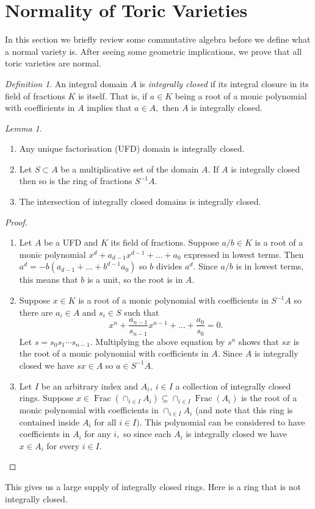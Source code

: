 \documentclass[BSc]{usydthesis}
\numberwithin{equation}{chapter}
\theoremstyle{remark}
\newtheorem{Definition}[equation]{Definition}
\newtheorem{Lemma}[equation]{Lemma}
\begin{document}
\section{Normality of Toric Varieties}


In this section we briefly review some commutative algebra before we define what a normal variety is. After seeing some geometric implications, we prove that all toric varieties are normal. 

\begin{Definition}
 An integral domain $A$ is {\em integrally closed} if its integral closure in its field of fractions $K$ is itself. That is, if $a \in K$ being a root of a monic polynomial with coefficients in $A$ implies that $a \in A,$ then $A$ is integrally closed. 
\end{Definition}

\begin{Lemma}\label{IntClosed}
~
\begin{enumerate}
 \item Any unique factorisation (UFD) domain is integrally closed.
 \item Let $S\subset A$ be a multiplicative set of the domain $A.$ If $A$ is integrally closed then so is the ring of fractions $S^{-1}A.$
 \item The intersection of integrally closed domains is integrally closed.
\end{enumerate}
\end{Lemma}

\begin{proof}
~
\begin{enumerate}
 \item Let $A$ be a UFD and $K$ its field of fractions. Suppose $a/b \in K$ is a root of a monic polynomial $x^d+a_{d-1}x^{d-1} + \ldots + a_0$ expressed in lowest terms. Then $a^d = -b(a_{d-1} + \ldots + b^{d-1}a_0 )$ so $b$ divides $a^d.$ Since $a/b$ is in lowest terms, this means that $b$ is a unit, so the root is in $A.$
 \item Suppose $x\in K$ is a root of a monic polynomial with coefficients in $S^{-1}A$ so there are $a_i\in A$ and $s_i\in S$ such that $$ x^n + \frac{a_{n-1} }{s_{n-1}} x^{n-1} + \ldots + \frac{a_0}{s_0} =0.$$ Let $s=s_0 s_1 \cdots s_{n-1}.$ Multiplying the above equation by $s^n$ shows that $sx$ is the root of a monic polynomial with coefficients in $A.$ Since $A$ is integrally closed we have $sx\in A$ so $a\in S^{-1}A.$
 \item Let $I$ be an arbitrary index and $A_i, \ i\in I$ a collection of integrally closed rings. Suppose $x\in \operatorname{Frac}( \cap_{i\in I} A_i) \subseteq \cap_{i\in I}\operatorname{Frac}(A_i)$ is the root of a monic polynomial with coefficients in $\cap_{i\in I} A_i$ (and note that this ring is contained inside $A_i$ for all $i\in I).$ This polynomial can be considered to have coefficients in $A_i$ for any $i,$ so since each $A_i$ is integrally closed we have $x\in A_i$ for every $i\in I.$  
\end{enumerate}
\end{proof}
This gives us a large supply of integrally closed rings. Here is a ring that is not integrally closed.
 
\end{document}
